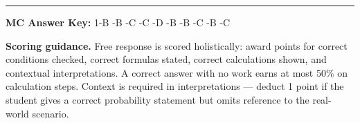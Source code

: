 \documentclass[10pt]{article}
\begin{document}
\vspace{0.15in}
\noindent\rule{\linewidth}{0.4pt}
\begin{center}
  \textbf{MC Answer Key:} 1-B -B -C -C -D -B -B -C -B -C
\end{center}

\begin{teachernote}
\textbf{Scoring guidance.} Free response is scored holistically: award points for correct conditions
checked, correct formulas stated, correct calculations shown, and contextual interpretations. A
correct answer with no work earns at most 50\% on calculation steps. Context is required in
interpretations --- deduct 1 point if the student gives a correct probability statement but omits
reference to the real-world scenario.
\end{teachernote}
\end{document}
